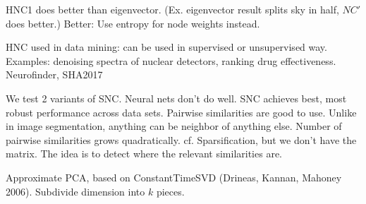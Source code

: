 
HNC1 does better than eigenvector. (Ex. eigenvector result splits sky in half, $NC'$ does better.)
Better: Use entropy for node weights instead. 

HNC used in data mining: can be used in supervised or unsupervised way. Examples: denoising spectra of nuclear detectors, ranking drug effectiveness. Neurofinder, SHA2017

We test 2 variants of SNC.
Neural nets don't do well. SNC achieves best, most robust performance across data sets. Pairwise similarities are good to use. Unlike in image segmentation, anything can be neighbor of anything else. Number of pairwise similarities grows quadratically. cf. Sparsification, but we don't have the matrix. The idea is to detect where the relevant similarities are. 

Approximate PCA, based on ConstantTimeSVD (Drineas, Kannan, Mahoney 2006).
Subdivide dimension into $k$ pieces.



